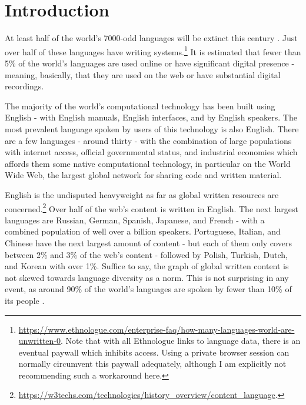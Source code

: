 \section{Introduction}
\label{sec:intro}

At least half of the world's 7000-odd languages will be extinct this century \citep{krauss92, grenoble2011cambridge}. Just over half of these languages have writing systems.\footnote{\href{https://www.ethnologue.com/enterprise-faq/how-many-languages-world-are-unwritten-0}{https://www.ethnologue.com/enterprise-faq/how-many-languages-world-are-unwritten-0}.  Note that with all Ethnologue links to language data, there is an eventual paywall which inhibits access. Using a private browser session can normally circumvent this paywall adequately, although I am explicitly not recommending such a workaround here.} It is estimated that fewer than 5\% of the world's languages are used online or have significant digital presence \citep{kornai2013digital} - meaning, basically, that they are used on the web or have substantial digital recordings.

The majority of the world's computational technology has been built using English - with English manuals, English interfaces, and by English speakers. The most prevalent language spoken by users of this technology is also English. There are a few languages - around thirty - with the combination of large populations with internet access, official governmental status, and industrial economies which affords them some native computational technology, in particular on the World Wide Web, the largest global network for sharing code and written material.

English is the undisputed heavyweight as far as global written resources are concerned.\footnote{\href{https://w3techs.com/technologies/history_overview/content_language}{https://w3techs.com/technologies/history\_overview/content\_language}. } Over half of the web's content is written in English. The next largest languages are Russian, German, Spanish, Japanese, and French - with a combined population of well over a billion speakers. Portuguese, Italian, and Chinese have the next largest amount of content - but each of them only covers between 2\% and 3\% of the web's content - followed by Polish, Turkish, Dutch, and Korean with over 1\%. Suffice to say, the graph of global written content is not skewed towards language diversity as a norm. This is not surprising in any event, as around 90\% of the world's languages are spoken by fewer than 10\% of its people \citep{bernard1992preserving}.


